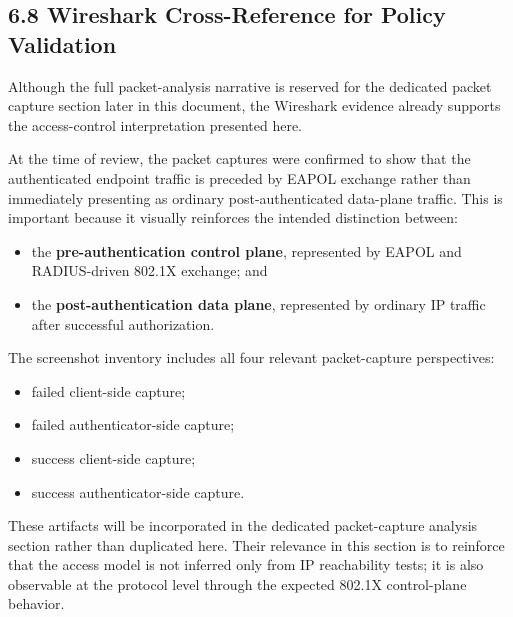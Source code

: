 \documentclass[11pt]{article}
\begin{document}
\subsection{6.8 Wireshark Cross-Reference for Policy Validation}
\label{sec:wireshark-cross-reference-for-policy-validation}

Although the full packet-analysis narrative is reserved for the dedicated packet capture section later in this document, the Wireshark evidence already supports the access-control interpretation presented here.

At the time of review, the packet captures were confirmed to show that the authenticated endpoint traffic is preceded by EAPOL exchange rather than immediately presenting as ordinary post-authenticated data-plane traffic. This is important because it visually reinforces the intended distinction between:

\begin{itemize}
    \item the \textbf{pre-authentication control plane}, represented by EAPOL and RADIUS-driven 802.1X exchange; and
    \item the \textbf{post-authentication data plane}, represented by ordinary IP traffic after successful authorization.
\end{itemize}

The screenshot inventory includes all four relevant packet-capture perspectives:

\begin{itemize}
    \item failed client-side capture;
    \item failed authenticator-side capture;
    \item success client-side capture;
    \item success authenticator-side capture.
\end{itemize}

These artifacts will be incorporated in the dedicated packet-capture analysis section rather than duplicated here. Their relevance in this section is to reinforce that the access model is not inferred only from IP reachability tests; it is also observable at the protocol level through the expected 802.1X control-plane behavior.

\end{document}
